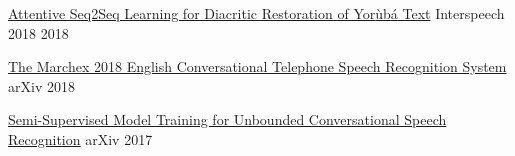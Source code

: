 \begin{cvhonors}
  \cvhonor
    {\href{https://arxiv.org/pdf/1804.00832}{Attentive Seq2Seq Learning for Diacritic Restoration of Yor{\`u}b{\'a} Text}} %
    {Interspeech 2018} %
    {} %
    {2018} %

  \cvhonor
    {\href{https://arxiv.org/pdf/1811.02058}{The Marchex 2018 English Conversational Telephone Speech Recognition System}} %
    {arXiv} %
    {} %
    {2018} %

  \cvhonor
    {\href{https://arxiv.org/pdf/1705.09724}{Semi-Supervised Model Training for Unbounded Conversational Speech Recognition}} %
    {arXiv} %
    {} %
    {2017} %



%    

\end{cvhonors}




